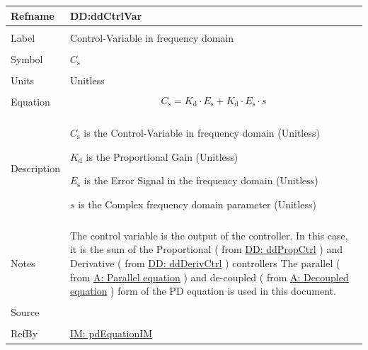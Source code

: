 \documentclass[12pt]{article}
\begin{document}
\vspace{\baselineskip}
\noindent
\begin{minipage}{\textwidth}
\begin{tabular}{>{\raggedright}p{}>{\raggedright\arraybackslash}p{}}
\toprule \textbf{Refname} & \textbf{DD:ddCtrlVar}
\label{DD:ddCtrlVar}
\\ \midrule \\
Label & Control-Variable in frequency domain
        
\\ \midrule \\
Symbol & ${C_{\text{s}}}$
         
\\ \midrule \\
Units & Unitless
        
\\ \midrule \\
Equation & \begin{displaymath}
           {C_{\text{s}}}={K_{\text{d}}}\cdot{}{E_{\text{s}}}+{K_{\text{d}}}\cdot{}{E_{\text{s}}}\cdot{}s
           \end{displaymath}
\\ \midrule \\
Description & \begin{symbDescription}
              \item{${C_{\text{s}}}$ is the Control-Variable in frequency domain (Unitless)}
              \item{${K_{\text{d}}}$ is the Proportional Gain (Unitless)}
              \item{${E_{\text{s}}}$ is the Error Signal in the frequency domain (Unitless)}
              \item{$s$ is the Complex frequency domain parameter (Unitless)}
              \end{symbDescription}
\\ \midrule \\
Notes & The control variable is the output of the controller. In this case, it is the sum of the Proportional ( from \hyperref[DD:ddPropCtrl]{DD: ddPropCtrl} ) and Derivative ( from  \hyperref[DD:ddDerivCtrl]{DD: ddDerivCtrl} ) controllers The parallel ( from \hyperref[parallelEq]{A: Parallel equation} ) and de-coupled ( from \hyperref[decoupled]{A: Decoupled equation} ) form of the PD equation is used in this document.
        
\\ \midrule \\
Source & \cite{johnson2008}
         
\\ \midrule \\
RefBy & \hyperref[IM:pdEquationIM]{IM: pdEquationIM}
        
\\ \bottomrule
\end{tabular}
\end{minipage}
\end{document}
